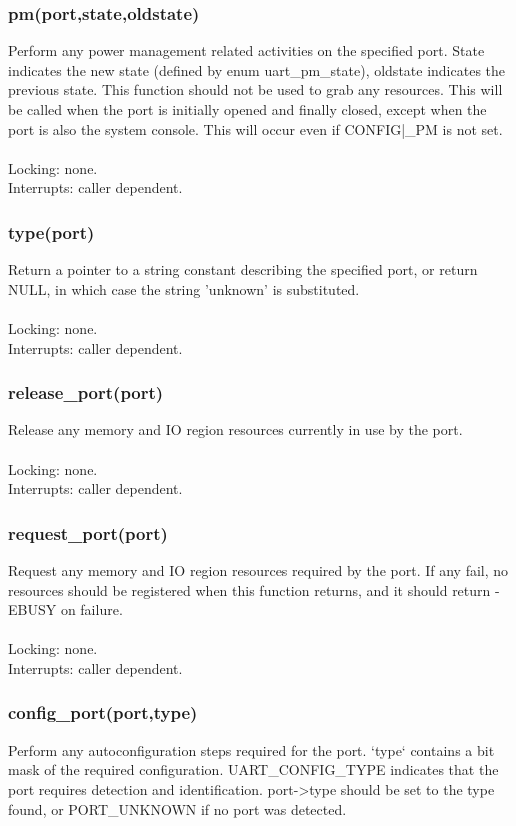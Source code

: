 \documentclass[12pt,a4paper]{article}
\begin{document}
\subsubsection{pm(port,state,oldstate)}
Perform any power management related activities on the specified
port.  State indicates the new state (defined by
enum uart\_pm\_state), oldstate indicates the previous state.
This function should not be used to grab any resources.
This will be called when the port is initially opened and finally
closed, except when the port is also the system console.  This
will occur even if CONFIG|\_PM is not set.\\ \\
Locking: none.\\
Interrupts: caller dependent.\\
\subsubsection{type(port)}
	Return a pointer to a string constant describing the specified
	port, or return NULL, in which case the string 'unknown' is
	substituted.\\ \\
	Locking: none.\\
	Interrupts: caller dependent.\\
\subsubsection{release\_port(port)}
	Release any memory and IO region resources currently in use by
	the port.\\ \\
	Locking: none.\\
	Interrupts: caller dependent.\\

\subsubsection{request\_port(port)}
	Request any memory and IO region resources required by the port.
	If any fail, no resources should be registered when this function
	returns, and it should return -EBUSY on failure.\\ \\
	Locking: none.\\
	Interrupts: caller dependent.\\
\subsubsection{config\_port(port,type)}
	Perform any autoconfiguration steps required for the port.  `type`
	contains a bit mask of the required configuration.  UART\_CONFIG\_TYPE
	indicates that the port requires detection and identification.
	port-\textgreater type should be set to the type found, or PORT\_UNKNOWN if no port was detected.\\
\end{document}
